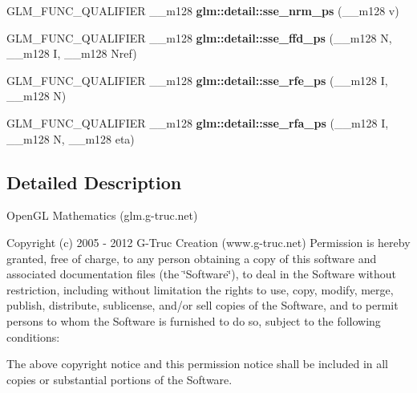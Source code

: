 \begin{DoxyCompactItemize}
\item 
\hypertarget{namespaceglm_1_1detail_a9f1826e935d79fc46faaf70499cba320}{\-G\-L\-M\-\_\-\-F\-U\-N\-C\-\_\-\-Q\-U\-A\-L\-I\-F\-I\-E\-R \-\_\-\-\_\-m128 {\bfseries glm\-::detail\-::sse\-\_\-nrm\-\_\-ps} (\-\_\-\-\_\-m128 v)}\label{namespaceglm_1_1detail_a9f1826e935d79fc46faaf70499cba320}

\item 
\hypertarget{namespaceglm_1_1detail_ace9256f388e836f9411a6eb92bed1a8a}{\-G\-L\-M\-\_\-\-F\-U\-N\-C\-\_\-\-Q\-U\-A\-L\-I\-F\-I\-E\-R \-\_\-\-\_\-m128 {\bfseries glm\-::detail\-::sse\-\_\-ffd\-\_\-ps} (\-\_\-\-\_\-m128 \-N, \-\_\-\-\_\-m128 \-I, \-\_\-\-\_\-m128 \-Nref)}\label{namespaceglm_1_1detail_ace9256f388e836f9411a6eb92bed1a8a}

\item 
\hypertarget{namespaceglm_1_1detail_a48dc48d40e141bd2fff6b9c88b7e05e4}{\-G\-L\-M\-\_\-\-F\-U\-N\-C\-\_\-\-Q\-U\-A\-L\-I\-F\-I\-E\-R \-\_\-\-\_\-m128 {\bfseries glm\-::detail\-::sse\-\_\-rfe\-\_\-ps} (\-\_\-\-\_\-m128 \-I, \-\_\-\-\_\-m128 \-N)}\label{namespaceglm_1_1detail_a48dc48d40e141bd2fff6b9c88b7e05e4}

\item 
\hypertarget{namespaceglm_1_1detail_a5086fa9f09dcfec333b9eebeae468767}{\-G\-L\-M\-\_\-\-F\-U\-N\-C\-\_\-\-Q\-U\-A\-L\-I\-F\-I\-E\-R \-\_\-\-\_\-m128 {\bfseries glm\-::detail\-::sse\-\_\-rfa\-\_\-ps} (\-\_\-\-\_\-m128 \-I, \-\_\-\-\_\-m128 \-N, \-\_\-\-\_\-m128 eta)}\label{namespaceglm_1_1detail_a5086fa9f09dcfec333b9eebeae468767}

\end{DoxyCompactItemize}


\subsection{\-Detailed \-Description}
\-Open\-G\-L \-Mathematics (glm.\-g-\/truc.\-net)

\-Copyright (c) 2005 -\/ 2012 \-G-\/\-Truc \-Creation (www.\-g-\/truc.\-net) \-Permission is hereby granted, free of charge, to any person obtaining a copy of this software and associated documentation files (the \char`\"{}\-Software\char`\"{}), to deal in the \-Software without restriction, including without limitation the rights to use, copy, modify, merge, publish, distribute, sublicense, and/or sell copies of the \-Software, and to permit persons to whom the \-Software is furnished to do so, subject to the following conditions\-:

\-The above copyright notice and this permission notice shall be included in all copies or substantial portions of the \-Software.


